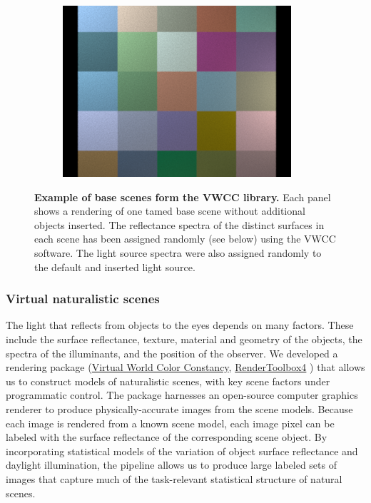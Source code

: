 \documentclass{jov}
\begin{document}
\begin{figure}[t]
\begin{subfigure}[b]{0.22 \textwidth}
        \includegraphics[width=\textwidth]{../Figures/Figure3/Figure3_f.png}
        \label{fig:baseSceneCheckerBoard}
    \end{subfigure}
    \caption{{\bf Example of base scenes form the VWCC library.} Each panel shows a rendering of one tamed base scene without additional objects inserted.  The reflectance spectra of the distinct surfaces in each scene has been assigned randomly (see below) using the VWCC software.  The light source spectra were also assigned randomly to the default and inserted light source.}\label{fig:baseScenes}
\end{figure}

\subsubsection{Virtual naturalistic scenes}

The light that reflects from objects to the eyes depends on many factors.
These include the surface reflectance, texture, material and geometry of the objects, the spectra of the illuminants, and the position of the observer.
We developed a rendering package (\href{https://github.com/BrainardLab/VirtualWorldColorConstancy}{Virtual World Color Constancy}, \href{http://rendertoolbox.org}{RenderToolbox4} \cite{heasly2014rendertoolbox3}) that allows us to construct models of naturalistic scenes, with key scene factors under programmatic control.
The package harnesses an open-source computer graphics renderer  \cite{jakob2015mitsuba} to produce physically-accurate images from the scene models.
Because each image is rendered from a known scene model, each image pixel can be labeled with the surface reflectance of the corresponding scene object.
By incorporating statistical models of the variation of object surface reflectance and daylight illumination, the pipeline allows us to produce large labeled sets of images that capture much of the task-relevant statistical structure of natural scenes.
\end{document}
